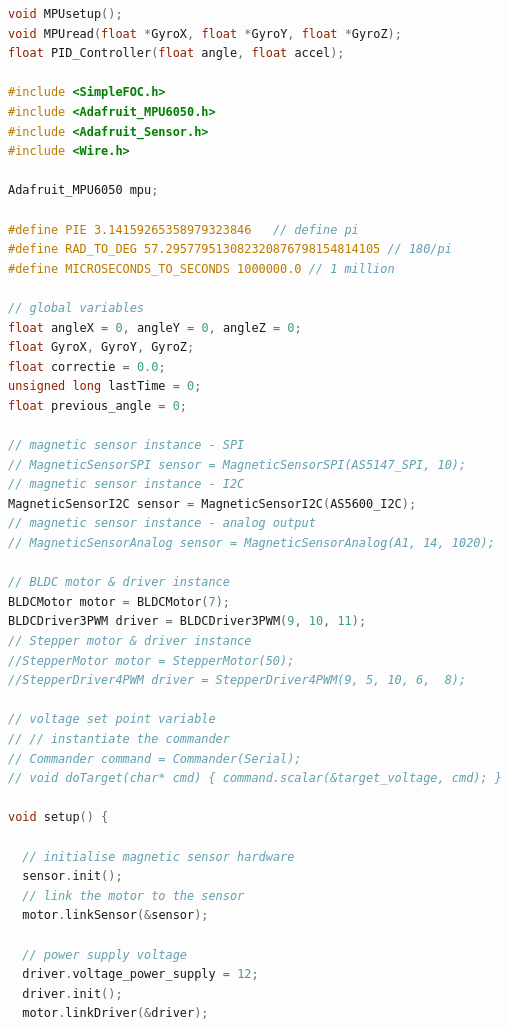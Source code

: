 \documentclass{article}
\begin{document}
\lstset{style=mystyle}
\begin{lstlisting}[language=C, caption=Arduino Nano Code]
void MPUsetup();
void MPUread(float *GyroX, float *GyroY, float *GyroZ);
float PID_Controller(float angle, float accel);

#include <SimpleFOC.h>
#include <Adafruit_MPU6050.h>
#include <Adafruit_Sensor.h>
#include <Wire.h>

Adafruit_MPU6050 mpu;

#define PIE 3.14159265358979323846   // define pi
#define RAD_TO_DEG 57.295779513082320876798154814105 // 180/pi
#define MICROSECONDS_TO_SECONDS 1000000.0 // 1 million

// global variables
float angleX = 0, angleY = 0, angleZ = 0;
float GyroX, GyroY, GyroZ;
float correctie = 0.0;
unsigned long lastTime = 0;
float previous_angle = 0;

// magnetic sensor instance - SPI
// MagneticSensorSPI sensor = MagneticSensorSPI(AS5147_SPI, 10);
// magnetic sensor instance - I2C
MagneticSensorI2C sensor = MagneticSensorI2C(AS5600_I2C);
// magnetic sensor instance - analog output
// MagneticSensorAnalog sensor = MagneticSensorAnalog(A1, 14, 1020);

// BLDC motor & driver instance
BLDCMotor motor = BLDCMotor(7);
BLDCDriver3PWM driver = BLDCDriver3PWM(9, 10, 11);
// Stepper motor & driver instance
//StepperMotor motor = StepperMotor(50);
//StepperDriver4PWM driver = StepperDriver4PWM(9, 5, 10, 6,  8);

// voltage set point variable
// // instantiate the commander
// Commander command = Commander(Serial);
// void doTarget(char* cmd) { command.scalar(&target_voltage, cmd); }

void setup() {

  // initialise magnetic sensor hardware
  sensor.init();
  // link the motor to the sensor
  motor.linkSensor(&sensor);

  // power supply voltage
  driver.voltage_power_supply = 12;
  driver.init();
  motor.linkDriver(&driver);


\end{lstlisting}
\end{document}
